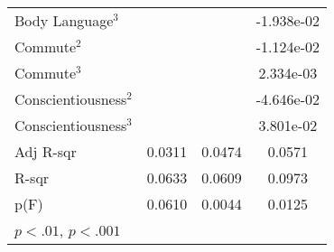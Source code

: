 {\begin{tabular}{l*{3}{c}}
    \addlinespace
    Body Language$^3$     &                             &                             & -1.938e-02                  \\
    \addlinespace
    Commute$^2$           &                             &                             & -1.124e-02                  \\
    \addlinespace
    Commute$^3$           &                             &                             & 2.334e-03                   \\
    \addlinespace
    Conscientiousness$^2$ &                             &                             & -4.646e-02                  \\
    \addlinespace
    Conscientiousness$^3$ &                             &                             & 3.801e-02                   \\
    \midrule
    Adj R-sqr             & 0.0311                      & 0.0474                      & 0.0571                      \\
    R-sqr                 & 0.0633                      & 0.0609                      & 0.0973                      \\
    p(F)                  & 0.0610                      & 0.0044                      & 0.0125                      \\
    \bottomrule
    \multicolumn{4}{l}{\footnotesize \sym{*} \(p<.01\), \sym{**} \(p<.001\)}                                        \\
\end{tabular}
}

